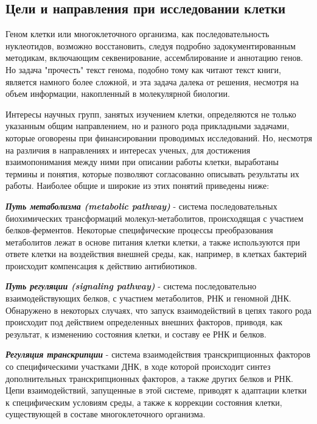 \subsection{Цели и направления при исследовании клетки}

Геном клетки или многоклеточного организма, как последовательность нуклеотидов, возможно восстановить, следуя подробно задокументированным методикам, включающим секвенирование, ассемблирование и аннотацию генов. Но задача "прочесть" текст генома, подобно тому как читают текст книги, является намного более сложной, и эта задача далека от решения, несмотря на объем информации, накопленный в молекулярной биологии. 

Интересы научных групп, занятых изучением клетки, определяются не только указанным общим направлением, но и разного рода прикладными задачами, которые оговорены при финансировании проводимых исследований. Но, несмотря на различия в направлениях и интересах ученых, для достижения взаимопонимания между ними при описании работы клетки, выработаны термины и понятия, которые позволяют согласованно описывать результаты их работы. Наиболее общие и широкие из этих понятий приведены ниже:

\noindent
\textbf{ \textit{Путь метаболизма (metabolic pathway)} } - система последовательных биохимических трансформаций молекул-метаболитов, происходящая с участием белков-ферментов. Некоторые специфические процессы преобразования метаболитов лежат в основе питания клетки клетки, а также используются при ответе клетки на воздействия внешней среды, как, например, в клетках бактерий происходит компенсация к действию антибиотиков.

\noindent
\textbf{ \textit{Путь регуляции (signaling pathway)} } - система последовательно взаимодействующих белков, с участием метаболитов, РНК и геномной ДНК. Обнаружено в некоторых случаях, что запуск взаимодействий в цепях такого рода происходит под действием определенных внешних факторов, приводя, как результат, к изменению состояния клетки, и составу ее РНК и белков.

\noindent
\textbf{ \textit{Регуляция транскрипции} } - система взаимодействия транскрипционных факторов со специфическими участками ДНК, в ходе которой происходит синтез дополнительных транскрипционных факторов, а также других белков и РНК. Цепи взаимодействий, запущенные в этой системе, приводят к адаптации клетки к специфическим условиям среды, а также к коррекции состояния клетки, существующей в составе многоклеточного организма.


